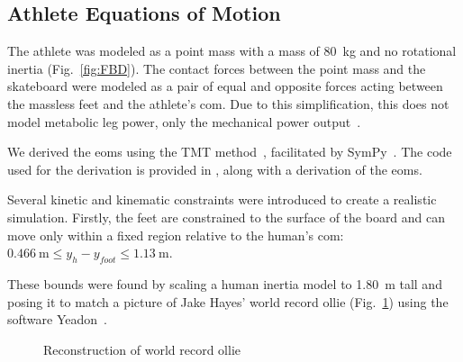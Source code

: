 \documentclass[default,iicol]{sn-jnl}
\begin{document}
\subsection{Athlete Equations of Motion}
The athlete was modeled as a point mass with a mass of \SI{80}{\kilo\gram} and no rotational inertia (Fig.~\ref{fig:FBD}).
The contact forces between the point mass and the skateboard were modeled as a pair of equal and opposite forces acting between the massless feet and the athlete's \acrfull{com}.
Due to this simplification, this does not model metabolic leg power, only the mechanical power output~\cite{van_der_kruk_power_2018,morin_biomechanics_2018}.

We derived the \glspl{eom} using the TMT method~\cite{vallery_heike_advanced_2018}, facilitated by SymPy~\cite{meurer_sympy_2017}.
The code used for the derivation is provided in \cite{heinen_optimal_2022}, along with a derivation of the \glspl{eom}.

Several kinetic and kinematic constraints were introduced to create a realistic simulation. Firstly, the feet are constrained to the surface of the board and can move only within a fixed region relative to the human’s \gls{com}: $\SI{0.466}{\meter} \leq y_h - y_{foot} \leq \SI{1.13}{\meter}$.

These bounds were found by scaling a human inertia model to \SI{1.80}{\meter} tall and posing it to match a picture of Jake Hayes' world record ollie  (Fig.~\ref{fig:f_record}) using the software Yeadon~\cite{Dembia2015}. 

\begin{figure}
    \centering
    \quad
    \caption{Reconstruction of world record ollie} 
    \label{fig:f_record}
\end{figure}
\end{document}
